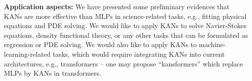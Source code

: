 \documentclass{article}
\numberwithin{equation}{section}
\numberwithin{figure}{section}
\begin{document}


{\bf Application aspects:} We have presented some preliminary evidences that KANs are more effective than MLPs in science-related tasks, e.g., fitting physical equations and PDE solving. We would like to apply KANs to solve Navier-Stokes equations, density functional theory, or any other tasks that can be formulated as regression or PDE solving. We would also like to apply KANs to machine-learning-related tasks, which would require integrating KANs into current architectures, e.g., transformers -- one may propose ``kansformers'' which replace MLPs by KANs in transformers. %
\end{document}
